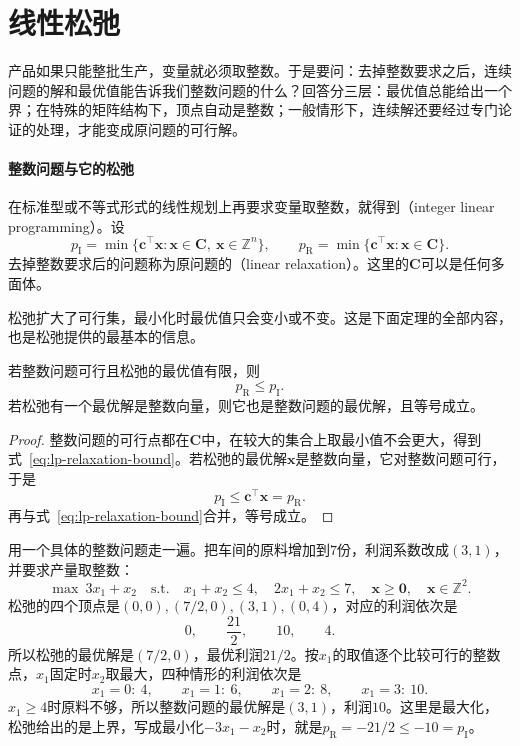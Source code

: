 \section{线性松弛}
\label{sec:lp-relaxation}

产品如果只能整批生产，变量就必须取整数。于是要问：去掉整数要求之后，连续问题的解和最优值能告诉我们整数问题的什么？回答分三层：最优值总能给出一个界；在特殊的矩阵结构下，顶点自动是整数；一般情形下，连续解还要经过专门论证的处理，才能变成原问题的可行解。

\paragraph{整数问题与它的松弛}
在标准型或不等式形式的线性规划上再要求变量取整数，就得到（integer linear programming）。设
\begin{equation}
 p_{\mathrm{I}}=\min\{\bm{c}^\top\bm{x}:\bm{x}\in\bm{C},\ \bm{x}\in\mathbb{Z}^n\},
 \qquad
 p_{\mathrm{R}}=\min\{\bm{c}^\top\bm{x}:\bm{x}\in\bm{C}\}.
 \label{eq:lp-relaxation-values}
\end{equation}
去掉整数要求后的问题称为原问题的（linear relaxation）。这里的$\bm{C}$可以是任何多面体。

松弛扩大了可行集，最小化时最优值只会变小或不变。这是下面定理的全部内容，也是松弛提供的最基本的信息。

\begin{theorem}[松弛给出下界]
 \label{thm:lp-relaxation-bound}
 若整数问题可行且松弛的最优值有限，则
 \begin{equation}
  p_{\mathrm{R}}\leq p_{\mathrm{I}}.
  \label{eq:lp-relaxation-bound}
 \end{equation}
 若松弛有一个最优解是整数向量，则它也是整数问题的最优解，且等号成立。
\end{theorem}

\begin{proof}
 整数问题的可行点都在$\bm{C}$中，在较大的集合上取最小值不会更大，得到式~\eqref{eq:lp-relaxation-bound}。若松弛的最优解$\bm{x}$是整数向量，它对整数问题可行，于是
 \[
  p_{\mathrm{I}}\leq\bm{c}^\top\bm{x}=p_{\mathrm{R}}.
 \]
 再与式~\eqref{eq:lp-relaxation-bound}合并，等号成立。
\end{proof}

用一个具体的整数问题走一遍。把车间的原料增加到$7$份，利润系数改成$(3,1)$，并要求产量取整数：
\[
 \max\ 3x_1+x_2\quad\text{s.t.}\quad x_1+x_2\leq4,\quad2x_1+x_2\leq7,\quad\bm{x}\geq\bm{0},\quad\bm{x}\in\mathbb{Z}^2.
\]
松弛的四个顶点是$(0,0),(7/2,0),(3,1),(0,4)$，对应的利润依次是
\[
 0,\qquad\frac{21}{2},\qquad10,\qquad4.
\]
所以松弛的最优解是$(7/2,0)$，最优利润$21/2$。按$x_1$的取值逐个比较可行的整数点，$x_1$固定时$x_2$取最大，四种情形的利润依次是
\[
 x_1=0:\ 4,\qquad x_1=1:\ 6,\qquad x_1=2:\ 8,\qquad x_1=3:\ 10.
\]
$x_1\geq4$时原料不够，所以整数问题的最优解是$(3,1)$，利润$10$。这里是最大化，松弛给出的是上界，写成最小化$-3x_1-x_2$时，就是$p_{\mathrm{R}}=-21/2\leq-10=p_{\mathrm{I}}$。


